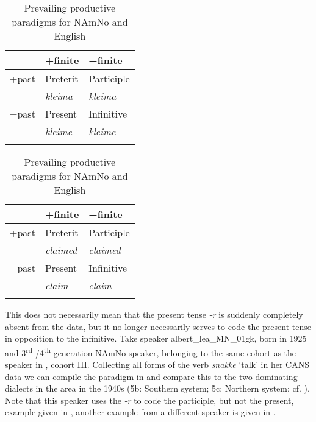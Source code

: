 \documentclass[output=paper]{langscibook}
\begin{document}
\begin{table}[h]
\begin{subtable}{.5\textwidth}\centering
	\caption{NAmNo}\label{tab:eide:3a}
	\begin{tabular}{lll}
	\lsptoprule
	      &	+finite         &  −finite \\\midrule
	+past & Preterit        & Participle	  \\
	      & \textit{kleima} & \textit{kleima} \\
	−past & Present         & Infinitive      \\
	      & \textit{kleime} & \textit{kleime}\\
	\lspbottomrule
	\end{tabular}
\end{subtable}\begin{subtable}{.5\textwidth}\centering
	\caption{English}\label{tab:eide:3b}
	\begin{tabular}{lll}
	\lsptoprule
	      &	+finite         &  −finite \\\midrule
	+past & Preterit        & Participle	  \\
	      & \textit{claimed} & \textit{claimed} \\
	−past & Present         & Infinitive      \\
	      & \textit{claim} & \textit{claim}\\
	\lspbottomrule
	\end{tabular}
\end{subtable}
\caption{Prevailing productive paradigms for NAmNo and English}
\end{table}

This does not necessarily mean that the present tense \textit{-r} is suddenly completely absent from the data, but it no longer necessarily serves to code the present tense in opposition to the infinitive. Take speaker albert\_lea\_MN\_01gk, born in 1925 and 3\textsuperscript{rd} /4\textsuperscript{th} generation NAmNo speaker, belonging to the same cohort as the speaker in , cohort III. Collecting all forms of the verb \textit{snakke} ‘talk’ in her CANS data we can compile the paradigm in  and compare this to the two dominating dialects in the area in the 1940s (5b: Southern system; 5c: Northern system; cf. \citealt{EideHjelde2023}). Note that this speaker uses the \textit{{}-r} to code the participle, but not the present, example given in , another example from a different speaker is given in . 
\end{document}
